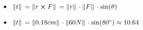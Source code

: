 \documentclass[../practica_01.tex]{subfiles}
\begin{document}
    \begin{itemize}
        \item $\norm*{t} = \norm*{r \crossproduct F} = \norm*{r}\cdot\norm*{F}\cdot \sin(\theta)$
        \item $\norm*{t} = \norm*{0.18 cm}\cdot\norm*{60N}\cdot\sin(80^\circ) \approx 10.64 $
    \end{itemize}
\end{document}
